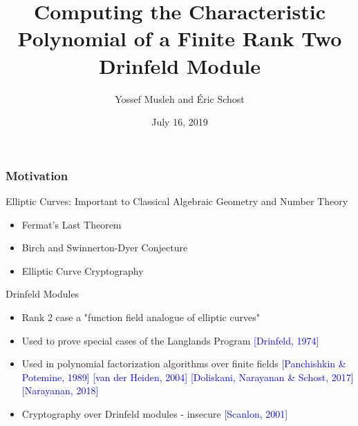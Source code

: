 \documentclass{beamer}
\title[]{Computing the Characteristic Polynomial of a Finite Rank Two Drinfeld Module} %
\author{  Yossef Musleh and \'Eric Schost} %
\institute[UW] %
{
University of Waterloo \\ %
\medskip
\textit{ISSAC 2019 \\ Beihang University \\ Beijing, People's Republic of China} %
}
\date{July 16, 2019} %
\newcommand{\blue}{\textcolor{blue}}
\begin{document}
\begin{frame}
\titlepage %
\end{frame}



\begin{frame}
\frametitle{Motivation}



  Elliptic Curves: Important to Classical Algebraic Geometry and Number Theory
\begin{itemize}
 \item     Fermat's Last Theorem
\item Birch and Swinnerton-Dyer Conjecture
 \item Elliptic Curve Cryptography
 \end{itemize}

    

 Drinfeld Modules

\begin{itemize}

\item Rank 2 case a "function field analogue of elliptic curves"
  \item Used to prove special cases of the Langlands Program \textcolor{blue}{[Drinfeld, 1974]}
   \item  Used in polynomial factorization algorithms over finite fields \blue{[Panchishkin \& Potemine, 1989]} \blue{[van der Heiden, 2004]} \blue{[Doliskani, Narayanan \& Schost, 2017]} \blue{[Narayanan, 2018]}
    
 
     \item Cryptography over Drinfeld modules - insecure \blue{[Scanlon, 2001]}
     \end{itemize}
  
  
  

\end{frame}
\end{document}
